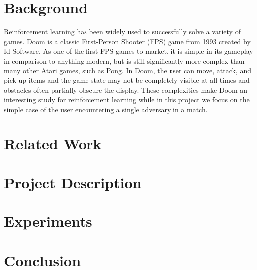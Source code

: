 \documentclass[letterpaper]{article} %
\begin{document}
\section{Background}
Reinforcement learning has been widely used to successfully solve a variety of games. Doom is a classic First-Person Shooter (FPS) game from 1993 created by Id Software. As one of the first FPS games to market, it is simple in its gameplay in comparison to anything modern, but is still significantly more complex than many other Atari games, such as Pong. In Doom, the user can move, attack, and pick up items and the game state may not be completely visible at all times and obstacles often partially obscure the display. These complexities make Doom an interesting study for reinforcement learning while in this project we focus on the simple case of the user encountering a single adversary in a match. 


\section{Related Work}



\section{Project Description}

\section{Experiments}

\section{Conclusion}
\end{document}
